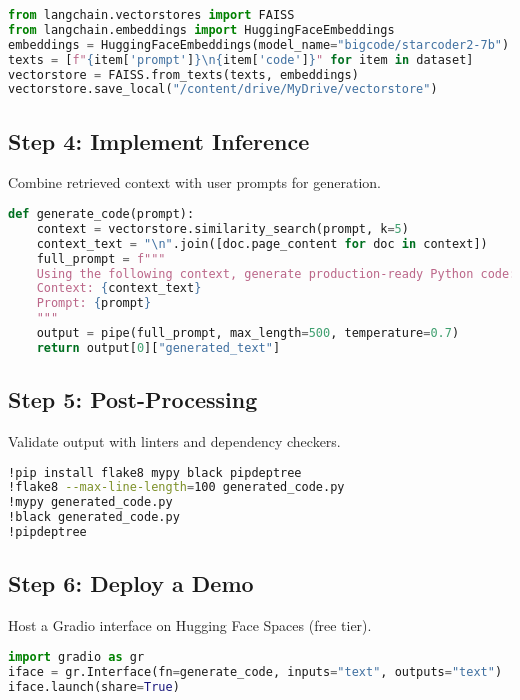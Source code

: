 \documentclass[12pt]{article}
\begin{document}
\begin{lstlisting}[language=Python, caption=Creating FAISS Vectorstore]
from langchain.vectorstores import FAISS
from langchain.embeddings import HuggingFaceEmbeddings
embeddings = HuggingFaceEmbeddings(model_name="bigcode/starcoder2-7b")
texts = [f"{item['prompt']}\n{item['code']}" for item in dataset]
vectorstore = FAISS.from_texts(texts, embeddings)
vectorstore.save_local("/content/drive/MyDrive/vectorstore")
\end{lstlisting}

\subsection{Step 4: Implement Inference}
Combine retrieved context with user prompts for generation.

\begin{lstlisting}[language=Python, caption=Generating Code with Context]
def generate_code(prompt):
    context = vectorstore.similarity_search(prompt, k=5)
    context_text = "\n".join([doc.page_content for doc in context])
    full_prompt = f"""
    Using the following context, generate production-ready Python code:
    Context: {context_text}
    Prompt: {prompt}
    """
    output = pipe(full_prompt, max_length=500, temperature=0.7)
    return output[0]["generated_text"]
\end{lstlisting}

\subsection{Step 5: Post-Processing}
Validate output with linters and dependency checkers.

\begin{lstlisting}[language=Bash, caption=Post-Processing Code]
!pip install flake8 mypy black pipdeptree
!flake8 --max-line-length=100 generated_code.py
!mypy generated_code.py
!black generated_code.py
!pipdeptree
\end{lstlisting}

\subsection{Step 6: Deploy a Demo}
Host a Gradio interface on Hugging Face Spaces (free tier).

\begin{lstlisting}[language=Python, caption=Gradio Interface]
import gradio as gr
iface = gr.Interface(fn=generate_code, inputs="text", outputs="text")
iface.launch(share=True)
\end{lstlisting}
\end{document}
